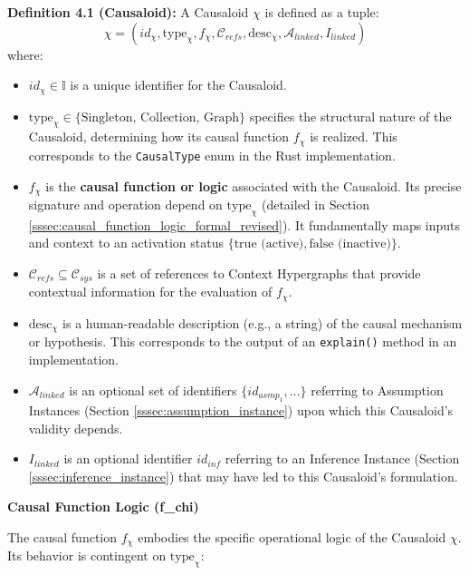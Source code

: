     
    \textbf{Definition 4.1 (Causaloid):} A Causaloid \( \chi \) is defined as a tuple:
    \[ \chi = (id_\chi, \text{type}_\chi, f_\chi, \mathcal{C}_{refs}, \text{desc}_\chi, \mathcal{A}_{linked}, I_{linked}) \]
    where:
    \begin{itemize}
        \item \( id_\chi \in \mathbb{I} \) is a unique identifier for the Causaloid.
        \item \( \text{type}_\chi \in \{\text{Singleton, Collection, Graph}\} \) specifies the structural nature of the Causaloid, determining how its causal function \(f_\chi\) is realized. This corresponds to the \texttt{CausalType} enum in the Rust implementation.
        \item \( f_\chi \) is the \textbf{causal function or logic} associated with the Causaloid. Its precise signature and operation depend on \(\text{type}_\chi\) (detailed in Section \ref{sssec:causal_function_logic_formal_revised}). It fundamentally maps inputs and context to an activation status \(\{\text{true (active)}, \text{false (inactive)}\}\).
        \item \( \mathcal{C}_{refs} \subseteq \mathcal{C}_{sys} \) is a set of references to Context Hypergraphs that provide contextual information for the evaluation of \(f_\chi\).
        \item \( \text{desc}_\chi \) is a human-readable description (e.g., a string) of the causal mechanism or hypothesis. This corresponds to the output of an \texttt{explain()} method in an implementation.
        \item \( \mathcal{A}_{linked} \) is an optional set of identifiers \(\{id_{asmp_1}, \dots\}\) referring to Assumption Instances (Section \ref{sssec:assumption_instance}) upon which this Causaloid's validity depends.
        \item \( I_{linked} \) is an optional identifier \(id_{inf}\) referring to an Inference Instance (Section \ref{sssec:inference_instance}) that may have led to this Causaloid's formulation.
    \end{itemize}


\textbf{Causal Function Logic (f\_chi)}
    
    
    The causal function \(f_\chi\) embodies the specific operational logic of the Causaloid \(\chi\). Its behavior is contingent on \(\text{type}_\chi\):

